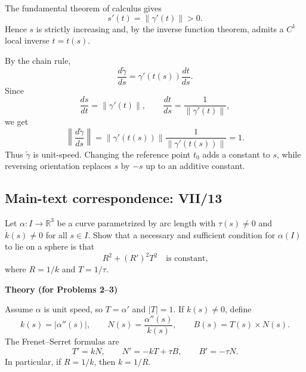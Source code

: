 \begin{solution}
The fundamental theorem of calculus gives
\[
s'(t)=\|\gamma'(t)\|>0.
\]
Hence \(s\) is strictly increasing and, by the inverse function theorem,
admits a \(C^1\) local inverse \(t=t(s)\).

By the chain rule,
\[
\frac{d\widetilde\gamma}{ds}
=
\gamma'(t(s))\frac{dt}{ds}.
\]
Since
\[
\frac{ds}{dt}=\|\gamma'(t)\|,
\qquad
\frac{dt}{ds}=\frac1{\|\gamma'(t)\|},
\]
we get
\[
\left\|\frac{d\widetilde\gamma}{ds}\right\|
=
\|\gamma'(t(s))\|
\frac1{\|\gamma'(t(s))\|}
=1.
\]
Thus \(\widetilde\gamma\) is unit-speed. Changing the reference point
\(t_0\) adds a constant to \(s\), while reversing orientation replaces
\(s\) by \(-s\) up to an additive constant.
\end{solution}

\subsection*{Main-text correspondence: VII/13}

\begin{problem}
\label{prob:cp-vii-0041}
Let $\alpha:I\to\mathbb{R}^3$ be a curve parametrized by arc length with $\tau(s)\neq 0$ and $\dot{k}(s)\neq 0$
	for all $s\in I$. Show that a necessary and sufficient condition for $\alpha(I)$ to lie on a sphere is that
	\[
	R^2 + (R')^2 T^2
	\quad\text{is constant,}
	\]
	where $R=1/k$ and $T=1/\tau$.
	
	\par\medskip\noindent\textbf{Theory (for Problems 2--3)}\par\smallskip

	Assume $\alpha$ is unit speed, so $T=\alpha'$ and $|T|=1$. If $k(s)\neq 0$, define
	\[
	k(s)=|\alpha''(s)|,\qquad N(s)=\frac{\alpha''(s)}{k(s)},\qquad B(s)=T(s)\times N(s).
	\]
	The Frenet--Serret formulas are
	\[
	T'=kN,\qquad N'=-kT+\tau B,\qquad B'=-\tau N.
	\]
	In particular, if $R=1/k$, then $k=1/R$.
\end{problem}

